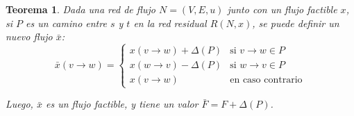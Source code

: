 \documentclass[a4paper]{report}
\newcommand{\si}{\text{si }}
\newcommand{\ecc}{\text{en caso contrario}}
\newtheorem*{theorem*}{Teorema}
\begin{document}
\label{teorema-camino-aumento}
\begin{theorem*}
    Dada una red de flujo $N = (V, E, u)$ junto con un flujo factible $x$, si $P$ es un camino entre $s$ y $t$ en la red residual $R(N, x)$, se puede definir un nuevo flujo $\bar{x}$:
        $$
        \bar{x}(v \rightarrow w) =
        \begin{cases}
            x(v \rightarrow w) + \Delta(P) & \si v \rightarrow w \in P \\
            x(w \rightarrow v) - \Delta(P) & \si w \rightarrow v \in P \\
            x(v \rightarrow w) & \ecc
        \end{cases}
        $$
    
    Luego, $\bar{x}$ es un flujo factible, y tiene un valor $\bar{F} = F + \Delta(P)$.
\end{theorem*}
\end{document}
